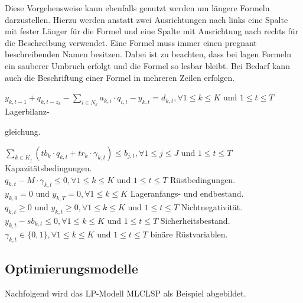 		Diese Vorgehensweise kann ebenfalls genutzt werden um längere Formeln darzustellen. Hierzu werden anstatt zwei Ausrichtungen nach links eine Spalte mit fester Länger für die Formel und eine Spalte mit Ausrichtung nach rechts für die Beschreibung verwendet. Eine Formel muss immer einen pregnant beschreibenden Namen besitzen. Dabei ist zu beachten, dass bei lagen Formeln ein sauberer Umbruch erfolgt und die Formel so lesbar bleibt. Bei Bedarf kann auch die Beschriftung einer Formel in mehreren Zeilen erfolgen.


			$y_{k,t-1} + q_{k,t-z_k} - \sum\limits_{i\in N_k}^{} a_{k,i} \cdot q_{i,t} - y_{k,t} = d_{k,t}, \forall 1 \le k \le K \text{ und } 1 \le t \le T$ \hfill Lagerbilanz-\\
			\begin{flushright}
				\vspace{-1.5em}
				gleichung.
			\end{flushright}
			$\sum\limits_{k\in K_j}^{} (tb_k \cdot q_{k,t} + tr_k \cdot \gamma_{k,t}) \le b_{j,t}, \forall 1 \le j \le J \text{ und } 1 \le t \le T$ \hfill Kapazitätsbedingungen. \\
			$q_{k,t} - M \cdot \gamma_{k,t} \le 0, \forall 1 \le k \le K \text{ und } 1 \le t \le T$ \hfill Rüstbedingungen. \\
			$y_{k,0} = 0 \text{ und } y_{k,T} = 0, \forall 1 \le k \le K$  \hfill Lageranfangs- und endbestand. \\
			$q_{k,t} \ge 0 \text{ und } y_{k,t} \ge 0, \forall 1 \le k \le K \text{ und } 1 \le t \le T$ \hfill Nichtnegativität. \\
			$y_{k,t} - sb_{k,t}\le 0, \forall 1 \le k \le K \text{ und } 1 \le t \le T$ \hfill Sicherheitsbestand. \\
			$\gamma_{k,t} \in \{0,1\}, \forall 1 \le k \le K \text{ und } 1 \le t \le T$ \hfill binäre Rüstvariablen. \\


    \subsection{Optimierungsmodelle}

Nachfolgend wird das LP-Modell MLCLSP als Beispiel abgebildet.

